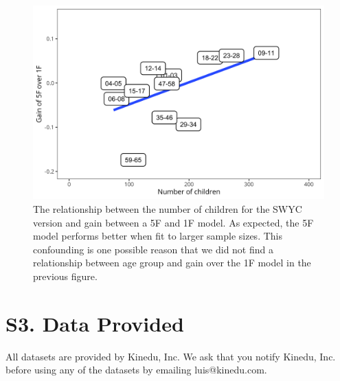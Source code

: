 \documentclass{article}
\begin{document}
\begin{figure}
\centering
\includegraphics[width=\textwidth]{figures/07.png}
\caption{The relationship between the number of children for the SWYC version and gain between a 5F and 1F model. As expected, the 5F model performs better when fit to larger sample sizes. This confounding is one possible reason that we did not find a relationship between age group and gain over the 1F model in the previous figure.}
\label{fig:confound}
\end{figure}


\section{S3. Data Provided}

All datasets are provided by Kinedu, Inc. We ask that you notify Kinedu, Inc. before using any of the datasets by emailing luis@kinedu.com. \\\\
\end{document}
